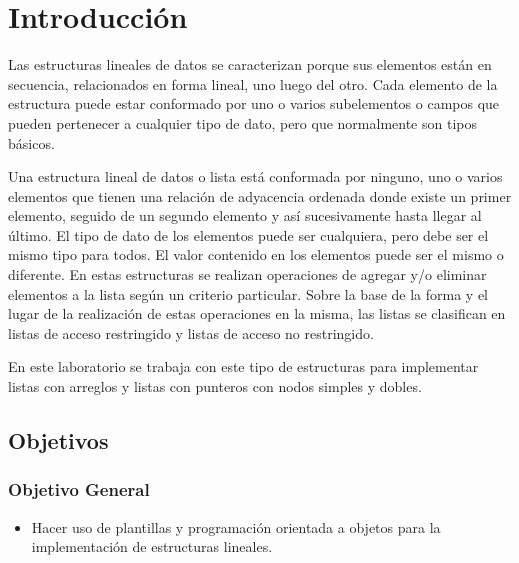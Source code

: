 \section{Introducción}

Las estructuras lineales de datos se caracterizan porque sus elementos están en secuencia, relacionados en forma lineal, uno luego del otro. Cada elemento de la estructura puede estar conformado por uno o varios subelementos o campos que pueden pertenecer a cualquier tipo de dato, pero que normalmente son tipos básicos.

Una estructura lineal de datos o lista está conformada por ninguno, uno o varios elementos que tienen una relación de adyacencia ordenada donde existe un primer elemento, seguido de un segundo elemento y así sucesivamente hasta llegar al último. El tipo de dato de los elementos puede ser cualquiera, pero debe ser el mismo tipo para todos. El valor contenido en los elementos puede ser el mismo o diferente. En estas estructuras se realizan operaciones de agregar y/o eliminar elementos a la lista según un criterio particular. Sobre la base de la forma y el lugar de la realización de estas operaciones en la misma, las listas se clasifican en listas de acceso restringido y listas de acceso no restringido. 

En este laboratorio se trabaja con este tipo de estructuras para implementar listas con arreglos y listas con punteros con nodos simples y dobles.



\subsection{Objetivos}

\subsubsection{Objetivo General}
\begin{itemize}
\item Hacer uso de plantillas y programación orientada a objetos para la implementación de estructuras lineales.
\end{itemize}

